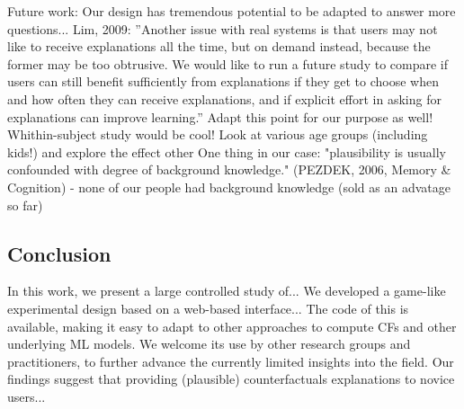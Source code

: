 {} \textcolor{ACMDarkBlue}{
Future work:
Our design has tremendous potential to be adapted to answer more questions...
} \textcolor{ACMDarkBlue}{
Lim, 2009: ''Another issue with real systems is that users may not like to receive explanations all the time, but on demand instead, because the former may be too obtrusive. We would like to run a future study to compare if users can still benefit sufficiently from explanations if they get to choose when and how often they can receive explanations, and if explicit effort in asking for explanations can improve learning.'' Adapt this point for our purpose as well!
} \textcolor{ACMDarkBlue}{
Whithin-subject study would be cool!
} \textcolor{ACMDarkBlue}{
Look at various age groups (including kids!) and explore the effect other 
}
\textcolor{ACMDarkBlue}{
One thing in our case: "plausibility is usually confounded with degree of background knowledge." (PEZDEK, 2006,  Memory \& Cognition) - none of our people had background knowledge (sold as an advatage so far)  
}

\subsection{Conclusion}\label{subsec:conclusion}
\textcolor{ACMDarkBlue}{
In this work, we present a large controlled study of...
We developed a game-like experimental design based on a web-based interface...
The code of this is available, making it easy to adapt to other approaches to compute CFs and other underlying ML models. We welcome its use by other research groups and practitioners, to further advance the currently limited insights into the field.
} \textcolor{ACMDarkBlue}{
Our findings suggest that providing (plausible) counterfactuals explanations to novice users...
}